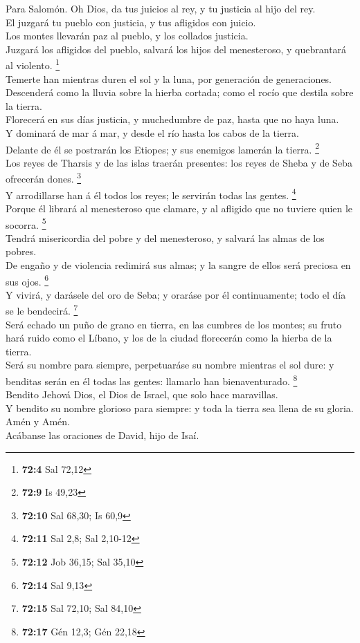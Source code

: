  Para Salomón. Oh Dios, da tus juicios al rey, y tu
justicia al hijo del rey.\\
 El juzgará tu pueblo con justicia, y tus afligidos con
juicio.\\
 Los montes llevarán paz al pueblo, y los collados
justicia.\\
 Juzgará los afligidos del pueblo, salvará los hijos del
menesteroso, y quebrantará al violento. \footnote{\textbf{72:4} Sal
  72,12}\\
 Temerte han mientras duren el sol y la luna, por
generación de generaciones.\\
 Descenderá como la lluvia sobre la hierba cortada; como
el rocío que destila sobre la tierra.\\
 Florecerá en sus días justicia, y muchedumbre de paz,
hasta que no haya luna.\\
 Y dominará de mar á mar, y desde el río hasta los cabos
de la tierra.\\
 Delante de él se postrarán los Etiopes; y sus enemigos
lamerán la tierra. \footnote{\textbf{72:9} Is 49,23}\\
 Los reyes de Tharsis y de las islas traerán presentes:
los reyes de Sheba y de Seba ofrecerán dones. \footnote{\textbf{72:10}
  Sal 68,30; Is 60,9}\\
 Y arrodillarse han á él todos los reyes; le servirán
todas las gentes. \footnote{\textbf{72:11} Sal 2,8; Sal 2,10-12}\\
 Porque él librará al menesteroso que clamare, y al
afligido que no tuviere quien le socorra. \footnote{\textbf{72:12} Job
  36,15; Sal 35,10}\\
 Tendrá misericordia del pobre y del menesteroso, y
salvará las almas de los pobres.\\
 De engaño y de violencia redimirá sus almas; y la sangre
de ellos será preciosa en sus ojos. \footnote{\textbf{72:14} Sal 9,13}\\
 Y vivirá, y darásele del oro de Seba; y oraráse por él
continuamente; todo el día se le bendecirá. \footnote{\textbf{72:15} Sal
  72,10; Sal 84,10}\\
 Será echado un puño de grano en tierra, en las cumbres
de los montes; su fruto hará ruido como el Líbano, y los de la ciudad
florecerán como la hierba de la tierra.\\
 Será su nombre para siempre, perpetuaráse su nombre
mientras el sol dure: y benditas serán en él todas las gentes: llamarlo
han bienaventurado. \footnote{\textbf{72:17} Gén 12,3; Gén 22,18}\\
 Bendito Jehová Dios, el Dios de Israel, que solo hace
maravillas.\\
 Y bendito su nombre glorioso para siempre: y toda la
tierra sea llena de su gloria. Amén y Amén.\\
 Acábanse las oraciones de David, hijo de Isaí.

